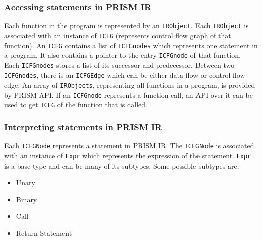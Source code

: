 \documentclass[11pt,a4paper,openright]{report}
\begin{document}
% 
% 
% 
% 
% 
% 
% 
% 
%      



\subsubsection{Accessing statements in PRISM IR}
Each function in the program is represented by an \texttt{IRObject}. Each \texttt{IRObject} is associated with an instance of \texttt{ICFG} (represents control flow graph of that function).
An \texttt{ICFG} contains a list of \texttt{ICFGnodes} which represents one statement in a program. It also contains a pointer to the entry \texttt{ICFGnode} of that function.
Each \texttt{ICFGnodes} stores a list of its successor and predecessor. Between two \texttt{ICFGnodes}, there is an \texttt{ICFGEdge} which can be either data flow or
control flow edge. An array of \texttt{IRObjects}, representing all functions in a program, is provided by PRISM API. If an \texttt{ICFGnode} represents a
function call, an API over it can be used to get \texttt{ICFG} of the function that is called.

\subsubsection{Interpreting statements in PRISM IR}
Each \texttt{ICFGNode} represents a statement in PRISM IR. The \texttt{ICFGNode} is associated with an instance of \texttt{Expr} which represents the expression of the 
statement. \texttt{Expr} is a base type and can be many of its subtypes. Some possible subtypes are: 
\begin{itemize}
 \item Unary
 \item Binary
 \item Call
 \item Return Statement
\end{itemize}
\end{document}
